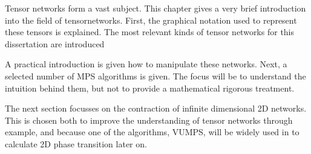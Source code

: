
Tensor networks form a vast subject. This chapter gives a very brief introduction into the field of tensornetworks. First, the graphical notation used to represent these tensors is explained. The most relevant kinds of tensor networks for this dissertation are introduced

A practical introduction is given how to manipulate these networks. Next, a selected number of MPS algorithms is given. The focus will be to understand the intuition behind them, but not to  provide a mathematical rigorous treatment.

The next section focusses on the contraction of infinite dimensional 2D networks. This is chosen both to improve the understanding of tensor networks through example, and because one of the algorithms, VUMPS, will be widely used in to calculate 2D phase transition later on.